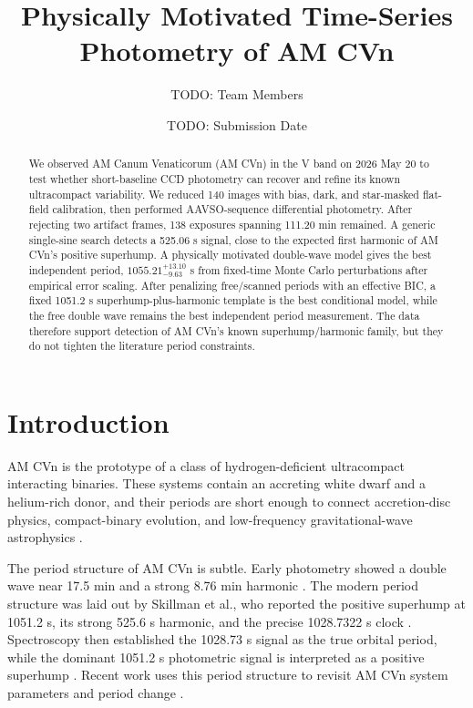 \documentclass[11pt]{article}
\title{Physically Motivated Time-Series Photometry of AM CVn}
\author{TODO: Team Members}
\date{TODO: Submission Date}
\begin{document}
\maketitle

\begin{abstract}
We observed AM Canum Venaticorum (AM CVn) in the V band on 2026 May 20 to test
whether short-baseline CCD photometry can recover and refine its known
ultracompact variability.  We reduced 140 images with bias, dark, and
star-masked flat-field calibration, then performed AAVSO-sequence differential
photometry.  After rejecting two artifact frames, 138 exposures spanning
111.20 min remained.  A generic single-sine search detects a 525.06 s signal,
close to the expected first harmonic of AM CVn's positive superhump.  A
physically motivated double-wave model gives the best independent period,
\(1055.21^{+13.10}_{-9.63}\) s from fixed-time Monte Carlo perturbations after
empirical error scaling.  After penalizing
free/scanned periods with an effective BIC, a fixed 1051.2 s
superhump-plus-harmonic template is the best conditional model, while the free
double wave remains the best independent period measurement.  The data
therefore support detection of AM CVn's known superhump/harmonic family, but
they do not tighten the literature period constraints.
\end{abstract}

\section{Introduction}

AM CVn is the prototype of a class of hydrogen-deficient ultracompact
interacting binaries.  These systems contain an accreting white dwarf and a
helium-rich donor, and their periods are short enough to connect accretion-disc
physics, compact-binary evolution, and low-frequency gravitational-wave
astrophysics \cite{solheim2010,roelofs2006}.

The period structure of AM CVn is subtle.  Early photometry showed a double
wave near 17.5 min and a strong 8.76 min harmonic \cite{patterson1979}.  The
modern period structure was laid out by Skillman et al., who reported the
positive superhump at 1051.2 s, its strong 525.6 s harmonic, and the precise
1028.7322 s clock \cite{skillman1999}.  Spectroscopy then established the
1028.73 s signal as the true orbital period, while the dominant 1051.2 s
photometric signal is interpreted as a positive superhump
\cite{nelemans2001,roelofs2006}.  Recent work uses this period structure to
revisit AM CVn system parameters and period change \cite{smak2023}.
\end{document}

